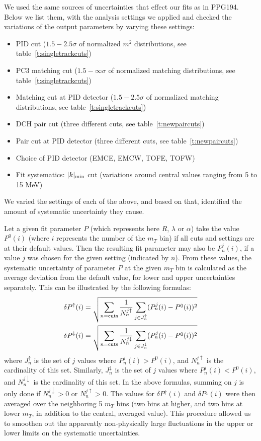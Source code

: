 \documentclass[11pt,a4paper]{article}
\numberwithin{equation}{subsection}
\numberwithin{figure}{section}
\begin{document}
We used the same sources of uncertainties that effect our fits as in PPG194. Below we list them, with the analysis settings we applied
and checked the variations of the output parameters by varying these settings:
\begin{itemize}
\item PID cut ($1.5-2.5\sigma$ of normalized $m^2$ distributions, see table~\ref{t:singletrackcuts})
\item PC3 matching cut ($1.5-\infty\sigma$ of normalized matching distributions, see table~\ref{t:singletrackcuts})
\item Matching cut at PID detector ($1.5-2.5\sigma$ of normalized matching distributions, see table~\ref{t:singletrackcuts})
\item DCH pair cut (three different cuts, see table~\ref{t:newpaircuts})
\item Pair cut at PID detector (three different cuts, see table~\ref{t:newpaircuts})
\item Choice of PID detector (EMCE, EMCW, TOFE, TOFW)
\item Fit systematics: $|k|_{\rm min}$ cut (variations around central values ranging from 5 to 15 MeV)
\end{itemize}
We varied the settings of each of the above, and based on that, identified the amount of systematic uncertainty they cause.

Let a given fit parameter $P$ (which represents here $R$, $\lambda$ or
$\alpha$) take the value $P^0(i)$ (where $i$ represents the number of the
$m_T$ bin) if all cuts and settings are at their default values. Then the
resulting fit parameter may also be $P_n^j(i)$, if a value $j$ was chosen for the
given setting (indicated by $n$). From these values, the systematic uncertainty of parameter
$P$ at the given $m_T$ bin is calculated as the average deviation from the
default value, for lower and upper uncertainties separately. This can be
illustrated by the following formulas:
\begin{align}
\delta P^\uparrow(i)  &=\sqrt{\sum_{n={\rm cuts}}\frac{1}{N_n^{j\uparrow  }}\sum_{j\in J_n^\uparrow  }(P_n^j(i)-P^0(i))^2}\\
\delta P^\downarrow(i)&=\sqrt{\sum_{n={\rm cuts}}\frac{1}{N_n^{j\downarrow}}\sum_{j\in J_n^\downarrow}(P_n^j(i)-P^0(i))^2}
\end{align}
where $J_n^\uparrow$ is the set of $j$ values where $P_n^j(i)>P^0(i)$, and
$N_n^{j\uparrow}$ is the cardinality of this set. Similarly, $J_n^\downarrow$
is the set of $j$ values where $P_n^j(i)<P^0(i)$, and $N_n^{j\downarrow}$ is
the cardinality of this set. In the above formulas, summing on $j$ is only done
if $N_n^{j\downarrow}>0$ or $N_n^{j\uparrow}>0$. The values for $\delta
P^\uparrow(i)$ and $\delta P^\downarrow(i)$ were then averaged over the
neighboring 5 $m_T$ bins (two bins at higher, and two bins
at lower $m_T$, in addition to the central, averaged value). This procedure
allowed us to smoothen out the apparently non-physically large fluctuations in
the upper or lower limits on the systematic uncertainties.
\end{document}
